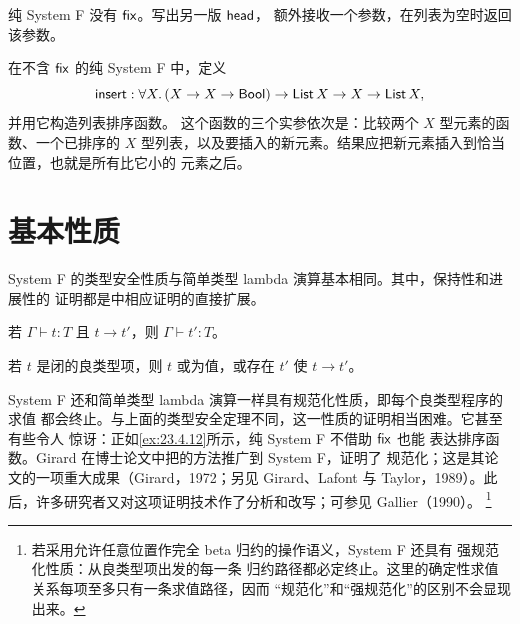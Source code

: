 \begin{exercise}[\(\star\star\)]
\label{ex:23.4.11}
纯 System F 没有 \(\mathsf{fix}\)。写出另一版 \(\mathsf{head}\)，
额外接收一个参数，在列表为空时返回该参数。
\end{exercise}

\begin{exercise}
\label{ex:23.4.12}
在不含 \(\mathsf{fix}\) 的纯 System F 中，定义
\[
\mathsf{insert}:
\forall X.\,(X\to X\to\mathsf{Bool})\to
\mathsf{List}\,X\to X\to\mathsf{List}\,X,
\]
并用它构造列表排序函数。
这个函数的三个实参依次是：比较两个 \(X\) 型元素的函数、一个已排序的
\(X\) 型列表，以及要插入的新元素。结果应把新元素插入到恰当位置，也就是所有比它小的
元素之后。
\end{exercise}

\section{基本性质}
\label{sec:23.5}

System F 的类型安全性质与简单类型 lambda 演算基本相同。其中，保持性和进展性的
证明都是中相应证明的直接扩展。

\begin{theorem}
\label{thm:23.5.1}
若 \(\Gamma\vdash t:T\) 且 \(t\longrightarrow t'\)，则
\(\Gamma\vdash t':T\)。
\end{theorem}

\begin{theorem}
\label{thm:23.5.2}
若 \(t\) 是闭的良类型项，则 \(t\) 或为值，或存在 \(t'\) 使
\(t\longrightarrow t'\)。
\end{theorem}

System F 还和简单类型 lambda 演算一样具有规范化性质，即每个良类型程序的求值
都会终止。与上面的类型安全定理不同，这一性质的证明相当困难。它甚至有些令人
惊讶：正如\cref{ex:23.4.12}所示，纯 System F 不借助 \(\mathsf{fix}\) 也能
表达排序函数。Girard 在博士论文中把的方法推广到 System F，证明了
规范化；这是其论文的一项重大成果（Girard，1972；另见 Girard、Lafont 与
Taylor，1989）。此后，许多研究者又对这项证明技术作了分析和改写；可参见
Gallier（1990）。
\footnote{若采用允许任意位置作完全 beta 归约的操作语义，System F 还具有
强规范化性质：从良类型项出发的每一条
归约路径都必定终止。这里的确定性求值关系每项至多只有一条求值路径，因而
“规范化”和“强规范化”的区别不会显现出来。}


